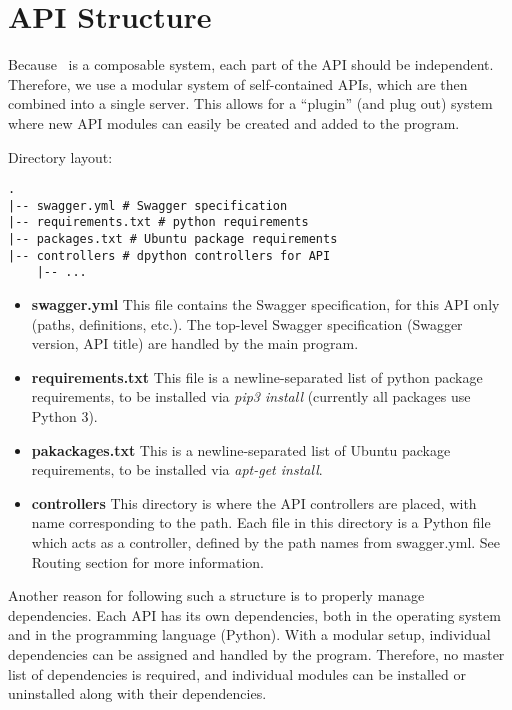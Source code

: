 \section{API Structure}

Because \projectname~is a composable system, each part of the API should
be independent. Therefore, we use a modular system of self-contained APIs,
which are then combined into a single server. This allows for a ``plugin''
(and plug out) system where new API modules can easily be created and added
to the program.

Directory layout:
\begin{verbatim}
.
|-- swagger.yml # Swagger specification
|-- requirements.txt # python requirements
|-- packages.txt # Ubuntu package requirements
|-- controllers # dpython controllers for API
    |-- ...

\end{verbatim}

\begin{itemize}
    \item\textbf{swagger.yml} This file contains the Swagger specification,
    for this API only (paths, definitions, etc.). The top-level Swagger
    specification (Swagger version, API title) are handled by the main program.

    \item\textbf{requirements.txt} This file is a newline-separated list of
    python package requirements, to be installed via \textit{pip3 install}
    (currently all packages use Python 3).

    \item\textbf{pakackages.txt} This is a newline-separated list of Ubuntu
    package requirements, to be installed via \textit{apt-get install}.

    \item\textbf{controllers} This directory is where the API controllers are
    placed, with name corresponding to the path. Each file in this directory
    is a Python file which acts as a controller, defined by the path names
    from swagger.yml. See Routing section for more information.
\end{itemize}

Another reason for following such a structure is to properly manage
dependencies. Each API has its own dependencies, both in the operating system
and in the programming language (Python). With a modular setup, individual
dependencies can be assigned and handled by the program. Therefore, no master
list of dependencies is required, and individual modules can be installed
or uninstalled along with their dependencies.

